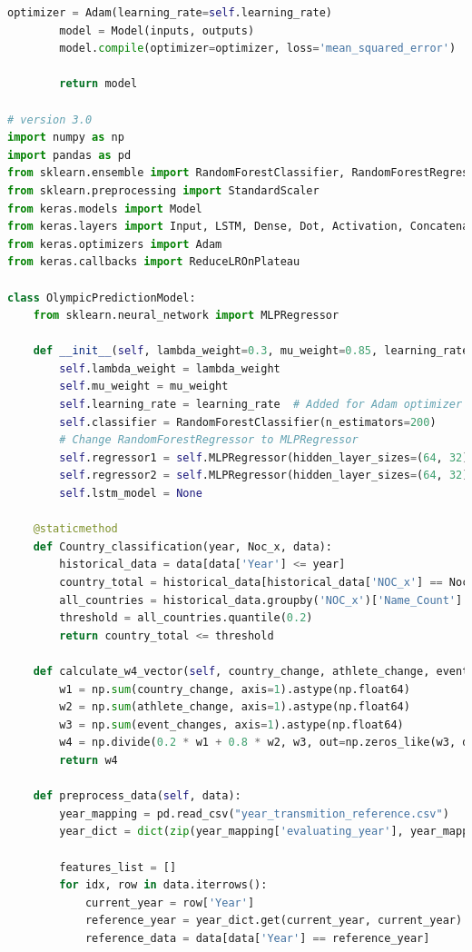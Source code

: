 \documentclass[12pt]{article}
\begin{document}
\begin{lstlisting}[language=Python, style=mystyle, caption=model.ipynb]
        optimizer = Adam(learning_rate=self.learning_rate)
        model = Model(inputs, outputs)
        model.compile(optimizer=optimizer, loss='mean_squared_error')

        return model

# version 3.0
import numpy as np
import pandas as pd
from sklearn.ensemble import RandomForestClassifier, RandomForestRegressor
from sklearn.preprocessing import StandardScaler
from keras.models import Model
from keras.layers import Input, LSTM, Dense, Dot, Activation, Concatenate
from keras.optimizers import Adam
from keras.callbacks import ReduceLROnPlateau

class OlympicPredictionModel:
    from sklearn.neural_network import MLPRegressor

    def __init__(self, lambda_weight=0.3, mu_weight=0.85, learning_rate=0.001):
        self.lambda_weight = lambda_weight
        self.mu_weight = mu_weight
        self.learning_rate = learning_rate  # Added for Adam optimizer tuning
        self.classifier = RandomForestClassifier(n_estimators=200)
        # Change RandomForestRegressor to MLPRegressor
        self.regressor1 = self.MLPRegressor(hidden_layer_sizes=(64, 32), max_iter=500, random_state=42)
        self.regressor2 = self.MLPRegressor(hidden_layer_sizes=(64, 32), max_iter=500, random_state=42)
        self.lstm_model = None

    @staticmethod
    def Country_classification(year, Noc_x, data):
        historical_data = data[data['Year'] <= year]
        country_total = historical_data[historical_data['NOC_x'] == Noc_x]['Name_Count'].sum()
        all_countries = historical_data.groupby('NOC_x')['Name_Count'].sum()
        threshold = all_countries.quantile(0.2)
        return country_total <= threshold

    def calculate_w4_vector(self, country_change, athlete_change, event_changes):
        w1 = np.sum(country_change, axis=1).astype(np.float64)
        w2 = np.sum(athlete_change, axis=1).astype(np.float64)
        w3 = np.sum(event_changes, axis=1).astype(np.float64)
        w4 = np.divide(0.2 * w1 + 0.8 * w2, w3, out=np.zeros_like(w3, dtype=np.float64), where=w3 != 0)
        return w4

    def preprocess_data(self, data):
        year_mapping = pd.read_csv("year_transmition_reference.csv")
        year_dict = dict(zip(year_mapping['evaluating_year'], year_mapping['use_data_from']))

        features_list = []
        for idx, row in data.iterrows():
            current_year = row['Year']
            reference_year = year_dict.get(current_year, current_year)
            reference_data = data[data['Year'] == reference_year]


\end{lstlisting}
\end{document}
